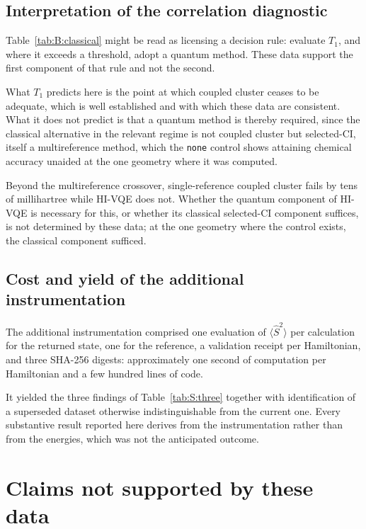 \documentclass[11pt,a4paper]{article}
\newcommand{\Ssq}{\ensuremath{\langle \hat{S}^2 \rangle}}
\newcommand{\code}[1]{\texttt{\small #1}}
\begin{document}
\subsection{Interpretation of the correlation diagnostic}

Table~\ref{tab:B:classical} might be read as licensing a decision rule:
evaluate $T_1$, and where it exceeds a threshold, adopt a quantum method. These
data support the first component of that rule and not the second.

What $T_1$ predicts here is the point at which coupled cluster ceases to be
adequate, which is well established and with which these data are consistent.
What it does not predict is that a quantum method is thereby required, since
the classical alternative in the relevant regime is not coupled cluster but
selected-CI, itself a multireference method, which the \code{none} control
shows attaining chemical accuracy unaided at the one geometry where it was
computed.

\begin{result}
Beyond the multireference crossover, single-reference coupled cluster fails by
tens of millihartree while HI-VQE does not. Whether the quantum component of
HI-VQE is necessary for this, or whether its classical selected-CI component
suffices, is not determined by these data; at the one geometry where the
control exists, the classical component sufficed.
\end{result}

\subsection{Cost and yield of the additional instrumentation}

The additional instrumentation comprised one evaluation of $\Ssq$ per
calculation for the returned state, one for the reference, a validation receipt
per Hamiltonian, and three SHA-256 digests: approximately one second of
computation per Hamiltonian and a few hundred lines of code.

It yielded the three findings of Table~\ref{tab:S:three} together with
identification of a superseded dataset otherwise indistinguishable from the
current one. Every substantive result reported here derives from the
instrumentation rather than from the energies, which was not the anticipated
outcome.

\section{Claims not supported by these data}
\label{sec:unsupported}
\end{document}

